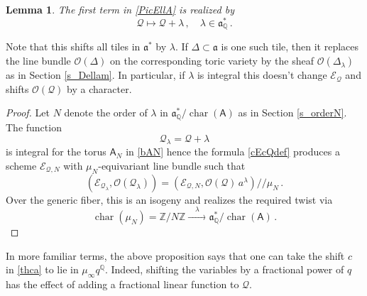 \documentclass[14pt]{extarticle}
\newcommand{\Q}{\mathbb{Q}}
\newcommand{\Z}{\mathbb{Z}}
\newcommand{\bA}{\mathsf{A}}
\newcommand{\cQ}{\mathscr{Q}}
\newcommand{\cE}{\mathscr{E}}
\newcommand{\cO}{\mathscr{O}}
\newcommand{\fa}{\mathfrak{a}}
\DeclareMathOperator{\cha}{char}
\newtheorem{Lemma}{Lemma}[section]
\theoremstyle{definition}
\begin{document}
\begin{Lemma}
The first term in \eqref{PicEllA} is realized by
$$
\cQ \mapsto \cQ + \lambda \,,  \quad \lambda \in \fa^*_\Q \,.
$$
\end{Lemma}

\noindent
Note that this shifts all tiles in $\fa^*$ by $\lambda$. If $\Delta
\subset \fa$ is one such tile, then it replaces the line bundle
$\cO(\Delta)$ on the corresponding toric variety by the sheaf 
$\cO(\Delta_\lambda)$ as in Section \ref{s_Dellam}. In particular,
if $\lambda$ is integral this doesn't change $\cE_\cQ$ and shifts
$\cO(\cQ)$ by a character. 

\begin{proof}
Let $N$ denote the order of $\lambda$ in $\fa^*_\Q/\cha(\bA)$ as in
Section \ref{s_orderN}.  The function
$$
\cQ_\lambda= \cQ+\lambda
$$
is integral for
the torus $\bA_N$ in \eqref{bAN} hence the formula \eqref{cEcQdef}
produces a scheme $\cE_{\cQ,N}$ with $\mu_N$-equivariant line bundle
such
that 
\begin{equation*}
      (\cE_{\cQ_\lambda}, \cO(\cQ_\lambda)) =  (\cE_{\cQ,N}, \cO(\cQ) \, a^\lambda)
      \Big/ \!\!\!\! \Big/\mu_N \,. 
\end{equation*}
Over the generic fiber, this is an isogeny and realizes the required
twist via
$$
\cha(\mu_N) = \Z/N\Z \xrightarrow{\quad \lambda \quad}  \fa^*_\Q/
\cha(\bA) \,.
$$
\end{proof}

In more familiar terms, the above proposition says that one
can take the shift $c$ in \eqref{thca} to lie in $\mu_\infty
q^{\Q}$. Indeed, shifting the variables by a fractional power of $q$
has the effect of adding a fractional linear function to $\cQ$. 
\end{document}
